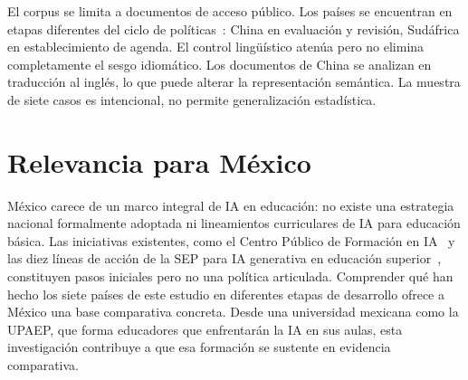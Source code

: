 El corpus se limita a documentos de acceso público. Los países se encuentran en etapas diferentes del ciclo de políticas~\citep{howlett2003studying}: China en evaluación y revisión, Sudáfrica en establecimiento de agenda. El control lingüístico atenúa pero no elimina completamente el sesgo idiomático. Los documentos de China se analizan en traducción al inglés, lo que puede alterar la representación semántica. La muestra de siete casos es intencional, no permite generalización estadística.


\section{Relevancia para México}
\label{sec:mexico}

México carece de un marco integral de IA en educación: no existe una estrategia nacional formalmente adoptada ni lineamientos curriculares de IA para educación básica. Las iniciativas existentes, como el Centro Público de Formación en IA~\citep{mexia2025centro} y las diez líneas de acción de la SEP para IA generativa en educación superior~\citep{sep2026ia}, constituyen pasos iniciales pero no una política articulada. Comprender qué han hecho los siete países de este estudio en diferentes etapas de desarrollo ofrece a México una base comparativa concreta. Desde una universidad mexicana como la UPAEP, que forma educadores que enfrentarán la IA en sus aulas, esta investigación contribuye a que esa formación se sustente en evidencia comparativa.
